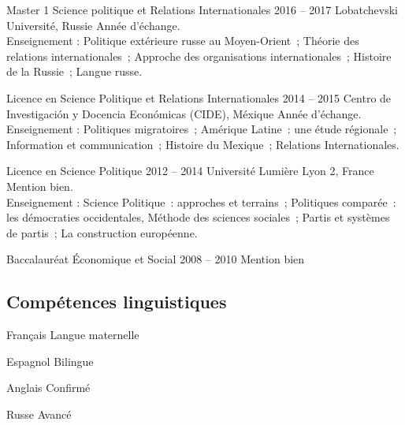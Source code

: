 \documentclass[30pt, french]{tccv}
\begin{document}
\begin{upshape}
\begin{education}
\vspace{0.5cm}
\item[Master 1 Science politique et Relations Internationales]{2016 -- 2017}
     {Lobatchevski Université, Russie}
     {Année d’échange.\\
     Enseignement : Politique extérieure russe au Moyen-Orient ; 
     Théorie des relations internationales ; 
     Approche des organisations internationales ; 
     Histoire de la Russie ; 
     Langue russe.
     }


\vspace{0.5cm}
\item[Licence en Science Politique et Relations Internationales]{2014 -- 2015}
     {Centro de Investigación y Docencia Económicas (CIDE), Méxique}
     {Année d’échange.\\
     Enseignement : Politiques migratoires ; Amérique Latine : une étude régionale ; Information et communication ; Histoire du Mexique ; Relations Internationales.
     }

     
\vspace{0.5cm}    
\item[Licence en Science Politique ]{2012 -- 2014}
     {Université Lumière Lyon 2, France}
     {Mention bien.\\
     Enseignement : Science Politique : approches et terrains ; Politiques comparée : les démocraties occidentales, Méthode des sciences sociales ; Partis et systèmes de partis ; La construction européenne. 
     }

     
\vspace{0.5cm}
\item[Baccalauréat Économique et Social]{2008 -- 2010}
     {}
     {Mention bien}


\end{education}


%
%


\begin{competence}


\section{Compétences linguistiques}
\fontsize{15pt}{1.6em}\color{text}\bodyfontlight\upshape\selectfont %
\begin{factlist}
\item{Français} {Langue maternelle}	
\item{Espagnol} {Bilingue}	
\item{Anglais} {Confirmé}	
\item{Russe} {Avancé}
\end{factlist}


\end{competence}
\end{upshape}
\end{document}
